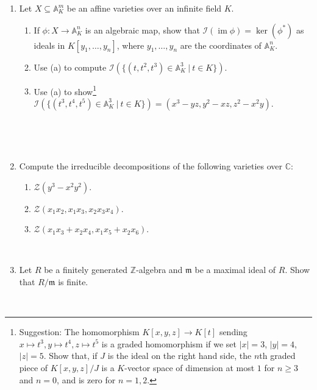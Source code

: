 \documentclass{amsart}[12pt]
\def\image{\operatorname{im}}
\def\im{\image}
\def\ker{\operatorname{ker}}
\newcommand{\A}{\mathbb{A}}
\newcommand{\Z}{\mathbb{Z}}
\numberwithin{equation}{section}
\theoremstyle{plain} %
\theoremstyle{definition}
\theoremstyle{remark}
\begin{document}
\begin{enumerate}
\item Let $X\subseteq \A^m_K$ be an affine varieties over an infinite field $K$.
\begin{enumerate}
\item If $\phi:X \to \A^n_K$ is an algebraic map, show that $\mathcal{I}(\im \phi) = \ker(\phi^*)$ as ideals in $K[y_1,\dots,y_n]$, where $y_1,\dots,y_n$ are the coordinates of $\A^n_K$.
\item Use (a) to compute $\mathcal{I}( \{ (t,t^2,t^3) \in \A^3_K \ | \ t\in K\} )$.
\item Use (a) to show\footnote{Suggestion: The homomorphism $K[x,y,z] \to K[t]$ sending $x\mapsto t^3, y\mapsto t^4, z\mapsto t^5$ is a graded homomorphism if we set $|x|=3$, $|y|=4$, $|z|=5$. Show that, if $J$ is the ideal on the right hand side, the $n$th graded piece of $K[x,y,z]/J$ is a $K$-vector space  of dimension at most $1$ for $n\geq 3$ and $n=0$, and is zero for $n=1,2$.} $\mathcal{I}( \{ (t^3,t^4,t^5) \in \A^3_K \ | \ t\in K\} ) = (x^3-yz,y^2-xz,z^2-x^2y)$.

\end{enumerate}

\


\hline 

\

\item Compute the irreducible decompositions of the following varieties over $\mathbb{C}$:
\begin{enumerate}
\item $\mathcal{Z}(y^3-x^2y^2)$.
\item $\mathcal{Z}(x_1x_2, x_1 x_3, x_2x_3x_4)$.
\item $\mathcal{Z}(x_1 x_3 + x_2 x_4, x_1 x_5 + x_2 x_6)$.
\end{enumerate}

\



\item Let $R$ be a finitely generated $\Z$-algebra and $\mathfrak{m}$ be a maximal ideal of $R$. Show that $R/\mathfrak{m}$ is finite.

\
\newpage


\end{enumerate}
\end{document}
